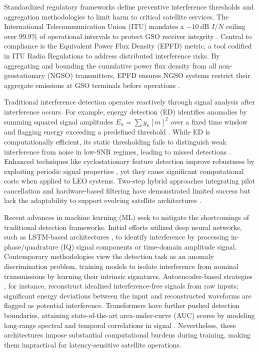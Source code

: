 \documentclass[10pt, conference]{IEEEtran}
\begin{document}
Standardized regulatory frameworks define preventive interference thresholds and aggregation methodologies to limit harm to critical satellite services. The International Telecommunication Union (ITU) mandates a $-10~\text{dB}$ $I / N$ ceiling over 99.9\% of operational intervals to protect GSO receiver integrity \cite{itur2017ProtectionCriteriaOperation}. Central to compliance is the Equivalent Power Flux Density (EPFD) metric, a tool codified in ITU Radio Regulations to address distributed interference risks. By aggregating and bounding the cumulative power flux density from all non-geostationary (NGSO) transmitters, EPFD ensures NGSO systems restrict their aggregate emissions at GSO terminals before operations \cite{itur2002AggregateDownlinkEquivalent}.

Traditional interference detection operates reactively through signal analysis after interference occurs. For example, energy detection (ED) identifies anomalies by summing squared signal amplitudes $E_{n } = \sum y_n[m]^{2}$ over a fixed time window and flagging energy exceeding a predefined threshold \cite{kay2009fundamentals}. While ED is computationally efficient, its static thresholding fails to distinguish weak interference from noise in low-SNR regimes, leading to missed detections  \cite{saifaldawlaGenAIBasedModelsNGSO2024}. Enhanced techniques like cyclostationary feature detection improve robustness by exploiting periodic signal properties \cite{experimentalCyclostationary}, yet they cause significant computational costs when applied to LEO systems. Two-step hybrid approaches integrating pilot cancellation and hardware-based filtering have demonstrated limited success but lack the adaptability to support evolving satellite architectures \cite{wangCoFrequencyInterferenceAnalysis2020}.

Recent advances in machine learning (ML) seek to mitigate the shortcomings of traditional detection frameworks. Initial efforts utilized deep neural networks, such as  LSTM-based architectures \cite{pellacoSpectrumPredictionInterference2019}, to identify interference by processing in-phase/quadrature (IQ) signal components or time-domain amplitude signal. Contemporary methodologies view the detection task as an anomaly discrimination problem, training models to isolate interference from nominal transmissions by learning their intrinsic signatures. Autoencoder-based strategies \cite{saifaldawlaConvolutionalAutoencodersNonGeostationary2024}, for instance, reconstruct idealized interference-free signals from raw inputs; significant energy deviations between the input and reconstructed waveforms are flagged as potential interference. Transformers have further pushed detection boundaries, attaining state-of-the-art area-under-curve (AUC) scores by modeling long-range spectral and temporal correlations in signal \cite{saifaldawlaGenAIBasedModelsNGSO2024}. Nevertheless, these architectures impose substantial computational burdens during training, making them impractical for latency-sensitive satellite operations.
\end{document}
